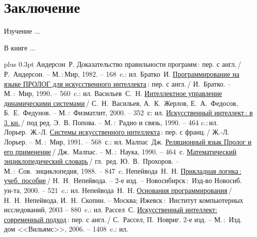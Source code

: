 \documentclass[14pt, openany, twoside, draft]{extbook} %
\def\emphbib#1{#1}
\begin{document}
\chapter*{Заключение}


Изучение ...

В книге ...


\begin{thebibliography}{99}\itemsep1pt \parskip 0pt plus 0.3pt
 Андерсон~Р. \emphbib{Доказательство правильности программ}\,{}: пер. с англ.\,{}/ Р.~Андерсон. -- М.\,:\,Мир, 1982. -- 168~c.: ил.
 Братко~И. \emphbib{\href{http://royallib.ru/book/bratko_ivan/programmirovanie_na_yazike_prolog_dlya_iskusstvennogo_intellekta.html}{Программирование на языке ПРОЛОГ для искусственного интеллекта}}\,{}: пер. с англ.\,/ И.~Братко. -- М.\,:~Мир, 1990. -- 560~c.: ил.
 Васильев~С.~Н. \emphbib{\href{http://bookfi.org/book/616050}{Интеллектное управление динамическими системами}}\,{}/ С.~Н.~Васильев, А.~К.~Жерлов, Е.~А.~Федосов, Б.~Е.~Федунов. -- М.\,:~Физматлит, 2000. -- 352~с: ил.
 \emphbib{\href{http://aihandbook.intsys.org.ru/index.php/intro/ai-handbook}{Искусственный интеллект\,{}: в 3~кн.}}\,{}/ под ред. Э.~В. Попова. -- М.\,:~Радио и связь, 1990. -- 464 c.:\,{}ил.
 Лорьер.~Ж.-Л.  \emphbib{\href{http://publ.lib.ru/ARCHIVES/L/LOR'ER_Jan_Lui/_Lor'er_J.L..html}{Системы искусственного интеллекта}\,{}: пер. с франц.}\,{}/ Ж.-Л. Лорьер. -- М.\,:~Мир, 1991. -- 568~с.: ил.
 Малпас~Дж. \emphbib{\href{http://padaread.com/?book=40731&pg=1}{Реляционный язык Пролог и его применение}}\,{}/ Дж.~Малпас. -- М.\,:~Наука, 1990. -- 464~с.
 \emphbib{\href{https://app.box.com/shared/793ukgvblxmj0hh6btw4}{Математический энциклопедический словарь}}\,{}/ гл.~ред. Ю.~В.~Прохоров. -- М.\,:~Сов.~энциклопедия, 1988. -- 847~c.
 Непейвода~Н.~Н. \emphbib{\href{http://www.logic-books.info/taxonomy/term/215}{Прикладная логика\,{}: учеб. пособие}}\,{}/ Н.~Н.~Непейвода. -- 2-е изд. -- Новосибирск\,{}:~Изд-во Новосиб. ун-та, 2000. -- 521~c.: ил.
 Непейвода~Н.~Н.  \emphbib{\href{http://philosophy.ru/library/logic_math/library/nepeivoda_prog.pdf}{Основания программирования}}\,{}/ Н.~Н.~Непейвода, И.~Н.~Скопин. -- Москва; Ижевск\,{}:~Институт компьютерных исследований, 2003 -- 880~c.: ил.
 Рассел~С. \href{http://www.aiportal.ru/downloads/books/ai-modern-approach-2-edition-by-rassel-norvig.html}{Искусственный интеллект: современный подход}\,{}: пер. с англ.\,{}/ С.~Рассел, П.~Новриг. 2-е изд. -- М.\,:~Изд. дом <<Вильямс>>, 2006. -- 1408~c.: ил.

\end{thebibliography}
\end{document}

